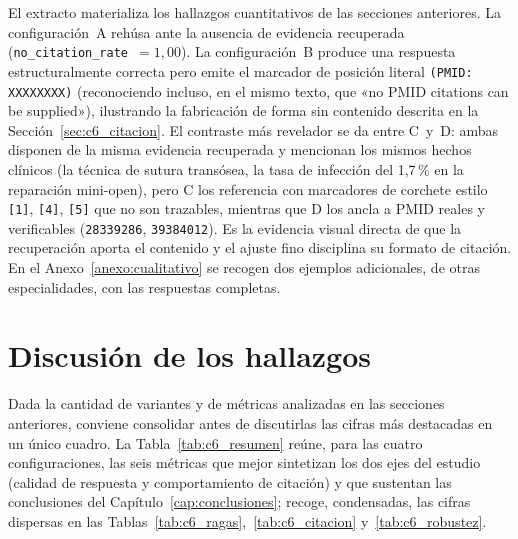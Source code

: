 \documentclass[11pt,a4paper,spanish]{book}
\numberwithin{equation}{chapter}
\numberwithin{figure}{chapter}
\begin{document}
El extracto materializa los hallazgos cuantitativos de las secciones anteriores. La configuración~A rehúsa ante la ausencia de evidencia recuperada (\texttt{no\_citation\_rate}~$=1{,}00$). La configuración~B produce una respuesta estructuralmente correcta pero emite el marcador de posición literal \texttt{(PMID: XXXXXXXX)} (reconociendo incluso, en el mismo texto, que «no PMID citations can be supplied»), ilustrando la fabricación de forma sin contenido descrita en la Sección~\ref{sec:c6_citacion}. El contraste más revelador se da entre C~y~D: ambas disponen de la misma evidencia recuperada y mencionan los mismos hechos clínicos (la técnica de sutura transósea, la tasa de infección del 1{,}7\,\% en la reparación mini-open), pero C los referencia con marcadores de corchete estilo \texttt{[1]}, \texttt{[4]}, \texttt{[5]} que no son trazables, mientras que D los ancla a PMID reales y verificables (\texttt{28339286}, \texttt{39384012}). Es la evidencia visual directa de que la recuperación aporta el contenido y el ajuste fino disciplina su formato de citación. En el Anexo~\ref{anexo:cualitativo} se recogen dos ejemplos adicionales, de otras especialidades, con las respuestas completas.

\section{Discusión de los hallazgos}
\label{sec:c6_discusion}

Dada la cantidad de variantes y de métricas analizadas en las secciones anteriores, conviene consolidar antes de discutirlas las cifras más destacadas en un único cuadro. La Tabla~\ref{tab:c6_resumen} reúne, para las cuatro configuraciones, las seis métricas que mejor sintetizan los dos ejes del estudio (calidad de respuesta y comportamiento de citación) y que sustentan las conclusiones del Capítulo~\ref{cap:conclusiones}; recoge, condensadas, las cifras dispersas en las Tablas~\ref{tab:c6_ragas},~\ref{tab:c6_citacion} y~\ref{tab:c6_robustez}.
\end{document}
